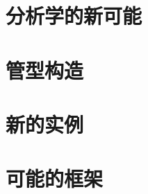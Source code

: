 \documentclass[a4paper,12pt]{article}
\begin{document}
\section{分析学的新可能}

\section{管型构造}

\section{新的实例}

\section{可能的框架}

\newpage
{}
{}


\end{document}
